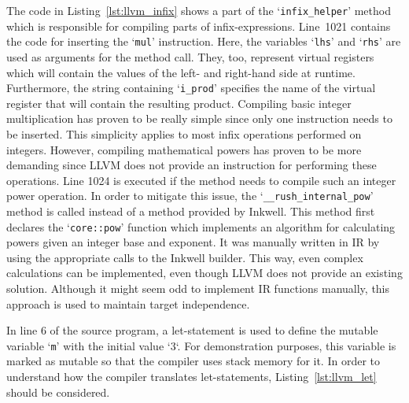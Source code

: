 The code in Listing~\ref{lst:llvm_infix} shows a part of the `\Verb|infix_helper|' method which is responsible for compiling parts of infix-expressions.
Line~1021 contains the code for inserting the `\texttt{mul}' instruction.
Here, the variables `\texttt{lhs}' and `\texttt{rhs}' are used as arguments for the  method call.
They, too, represent virtual registers which will contain the values of the left- and right-hand side at runtime.
Furthermore, the string containing `\Verb|i_prod|' specifies the name of the virtual register that will contain the resulting product.
Compiling basic integer multiplication has proven to be really simple since only one instruction needs to be inserted.
This simplicity applies to most infix operations performed on integers.
However, compiling mathematical powers has proven to be more demanding since LLVM does not provide an instruction for performing these operations.
Line 1024 is executed if the method needs to compile such an integer power operation.
In order to mitigate this issue, the `\Verb|__rush_internal_pow|' method is called instead of a method provided by Inkwell.
This method first declares the `\Verb|core::pow|' function which implements an algorithm for calculating powers given an integer base and exponent.
It was manually written in IR by using the appropriate calls to the Inkwell builder.
This way, even complex calculations can be implemented, even though LLVM does not provide an existing solution.
Although it might seem odd to implement IR functions manually, this approach is used to maintain target independence.

In line 6 of the source program, a let-statement is used to define the mutable variable `\texttt{m}' with the initial value `3`.
For demonstration purposes, this variable is marked as mutable so that the compiler uses stack memory for it.
In order to understand how the compiler translates let-statements, Listing~\ref{lst:llvm_let} should be considered.



